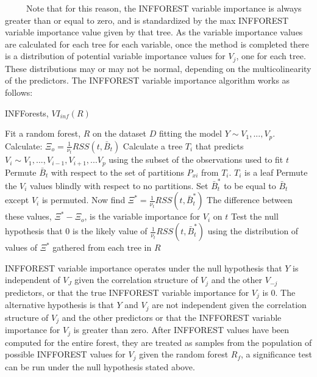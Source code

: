 \documentclass[12pt,twoside]{reedthesis}
\begin{document}
  ~~~~~Note that for this reason, the INFFOREST variable importance is
  always greater than or equal to zero, and is standardized by the max
  INFFOREST variable importance value given by that tree. As the variable
  importance values are calculated for each tree for each variable, once
  the method is completed there is a distribution of potential variable
  importance values for \(V_j\), one for each tree. These distributions
  may or may not be normal, depending on the multicolinearity of the
  predictors. The INFFOREST variable importance algorithm works as
  follows:
  
  \begin{algorithm}
  \caption{INFForests, $VI_{inf}(R)$}
  \label{infforest}
  \begin{algorithmic}[1]
  \State Fit a random forest, $R$ on the dataset $D$ fitting the model $Y \sim V_1,...,V_p$.
  \State Calculate: $\Xi_o =  \frac 1 {\nu_t} RSS(t,\bar{B}_t)$
  \State Calculate a tree $T_i$ that predicts $V_i \sim V_1,...,V_{i-1}, V_{i+1},...V_p$ using the subset of the observations used to fit $t$  
  \State Permute $\bar{B}_t$ with respect to the set of partitions $P_{xi}$ from $T_i$.
  \If $T_i$ is a leaf
  \State Permute the $V_i$ values blindly with respect to no partitions. Set $\bar{B}_t^*$ to be equal to $\bar{B}_t$ except $V_i$ is permuted. 
  \EndIf
  \State Now find $\Xi^* =  \frac 1 {\nu_t} RSS(t,\bar{B}_t^*)$
  \State The difference between these values, $\Xi^* - \Xi_o$,  is the variable importance for $V_i$ on $t$
  \EndFor
  \State Test the null hypothesis that $0$ is the likely value of $\frac 1 {\nu_t} RSS(t,\bar{B}_t^*)$ using the distribution of values of $\Xi^*$ gathered from each tree in $R$
  \EndFor
  \end{algorithmic}
  \end{algorithm}
  
  INFFOREST variable importance operates under the null hypothesis that
  \(Y\) is independent of \(V_J\) given the correlation structure of
  \(V_j\) and the other \(V_{-j}\) predictors, or that the true INFFOREST
  variable importance for \(V_j\) is 0. The alternative hypothesis is that
  \(Y\) and \(V_j\) are not independent given the correlation structure of
  \(V_j\) and the other predictors or that the INFFOREST variable
  importance for \(V_j\) is greater than zero. After INFFOREST values have
  been computed for the entire forest, they are treated as samples from
  the population of possible INFFOREST values for \(V_j\) given the random
  forest \(R_f\), a significance test can be run under the null hypothesis
  stated above.
  
\end{document}
